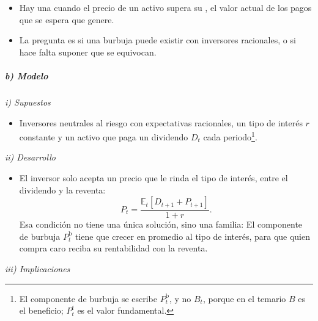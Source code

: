 \documentclass[11pt]{article}
\begin{document}
\begin{itemize}
\item Hay una  cuando el precio de un activo supera su , el valor actual de los pagos que se espera que genere.
\item La pregunta es si una burbuja puede existir con inversores racionales, o si hace falta suponer que se equivocan.
\end{itemize}

\subparagraph{b) Modelo}

\hspace*{3.6em}\emph{i) Supuestos}

\begin{itemize}
\item Inversores neutrales al riesgo con expectativas racionales, un tipo de interés $r$ constante y un activo que paga un dividendo $D_t$ cada periodo\footnote{El componente de burbuja se escribe $P^{\mathrm b}_t$, y no $B_t$, porque en el temario $B$ es el beneficio; $P^{\mathrm f}_t$ es el valor fundamental.}.
\end{itemize}

\hspace*{3.6em}\emph{ii) Desarrollo}

\begin{itemize}
\item El inversor solo acepta un precio que le rinda el tipo de interés, entre el dividendo y la reventa:
  \begin{equation}\label{eq:arbitraje}
  P_t=\frac{\mathbb{E}_t\left[D_{t+1}+P_{t+1}\right]}{1+r}.
  \end{equation}
  Esa condición no tiene una única solución, sino una familia\nocite{BlanchardWatson1982}:
  El componente de burbuja $P^{\mathrm b}_t$ tiene que crecer en promedio al tipo de interés, para que quien compra caro reciba su rentabilidad con la reventa.
\end{itemize}

\hspace*{3.6em}\emph{iii) Implicaciones}
\end{document}
